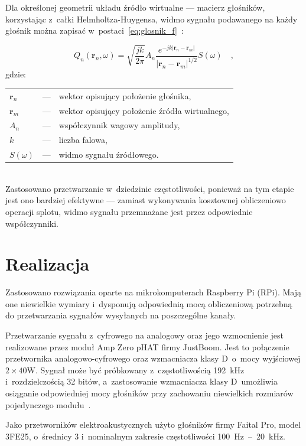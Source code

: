 \documentclass[10pt, a4paper]{article}
\let\Oldsection\section
\renewcommand{\section}{\FloatBarrier\Oldsection}
\begin{document}
Dla określonej geometrii układu źródło wirtualne --- macierz głośników,
korzystając z~całki Helmholtza-Huygensa, widmo sygnału podawanego na każdy głośnik można zapisać
w~postaci~\eqref{eq:glosnik_f}~\cite{enhancement}:

\begin{equation}
  Q_n(\bm{r}_n,\omega) = \sqrt{\frac{jk}{2\pi}} A_n \frac {e^{-jk|\bm{r}_n-\bm{r}_m|}}{|\bm{r}_n-\bm{r}_m|^{1/2}} S(\omega) \quad,
  \label{eq:glosnik_f}
\end{equation}
gdzie:\\
\indent \begin{tabular}{l c p{}}
  $\bm{r}_n$ & --- & wektor opisujący położenie głośnika, \\
  $\bm{r}_m$ & --- & wektor opisujący położenie źródła wirtualnego,\\
  $A_n$ & --- & współczynnik wagowy amplitudy,\\
  $k$ & --- & liczba falowa,\\
  $S(\omega)$ & --- & widmo sygnału źródłowego.
\end{tabular}\\

Zastosowano przetwarzanie w~dziedzinie częstotliwości, ponieważ na tym etapie jest ono bardziej efektywne
--- zamiast wykonywania kosztownej obliczeniowo operacji splotu, widmo sygnału przemnażane jest przez
odpowiednie współczynniki.

\section{Realizacja}

Zastosowano rozwiązania oparte na mikrokomputerach Raspberry
Pi (RPi). Mają one niewielkie wymiary i~dysponują odpowiednią mocą obliczeniową
potrzebną do przetwarzania sygnałów wysyłanych na poszczególne kanały.

Przetwarzanie sygnału z~cyfrowego na analogowy oraz jego wzmocnienie jest
realizowane przez moduł Amp Zero pHAT firmy JustBoom. Jest to połączenie
przetwornika analogowo-cyfrowego oraz wzmacniacza klasy D~o~mocy wyjściowej
$2\times40\si{\watt}$. Sygnał może być próbkowany z~częstotliwością
\SI{192}{\kilo\hertz} i~rozdzielczością \num{32} bitów, a~zastosowanie
wzmacniacza klasy D~umożliwia osiąganie odpowiedniej mocy głośników przy
zachowaniu niewielkich rozmiarów pojedynczego modułu~\cite{oska}.

Jako przetworników elektroakustycznych użyto głośników firmy Faital Pro, model 3FE25,
o~średnicy \SI{3}{\inch} i~nominalnym zakresie
częstotliwości \SI{100}{\hertz}~--~\SI{20}{\kilo\hertz}.
\end{document}
